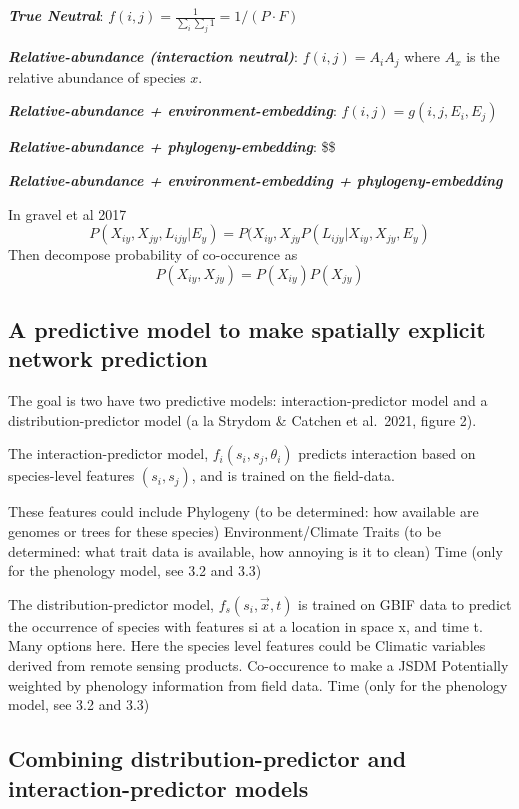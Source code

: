 \documentclass[11pt]{article}
\begin{document}
\textbf{\emph{True Neutral}}:
\(f(i,j) = \frac{1}{\sum_i \sum_j 1} = 1 / (P\cdot F)\)

\textbf{\emph{Relative-abundance (interaction neutral)}}:
\(f(i,j) = A_i A_j\) where \(A_x\) is the relative abundance of species
\(x\).

\textbf{\emph{Relative-abundance + environment-embedding}}:
\(f(i,j) = g(i,j, E_i, E_j)\)

\textbf{\emph{Relative-abundance + phylogeny-embedding}}: \$\$

\textbf{\emph{Relative-abundance + environment-embedding +
phylogeny-embedding}}

In gravel et al 2017
\[P(X_{iy}, X_{jy}, L_{ijy} | E_y) = P(X_{iy},X_{jy}P(L_{ijy} | X_{iy}, X_{jy}, E_y)\]
Then decompose probability of co-occurence as
\[P(X_{iy}, X_{jy}) = P(X_{iy})P(X_{jy})\]

\hypertarget{a-predictive-model-to-make-spatially-explicit-network-prediction}{%
\subsection{A predictive model to make spatially explicit network
prediction}\label{a-predictive-model-to-make-spatially-explicit-network-prediction}}

The goal is two have two predictive models: interaction-predictor model
and a distribution-predictor model (a la Strydom \& Catchen et al.~2021,
figure 2).

The interaction-predictor model, \(f_i(s_i,s_j, \theta_i)\) predicts
interaction based on species-level features \((s_i, s_j)\), and is
trained on the field-data.

These features could include Phylogeny (to be determined: how available
are genomes or trees for these species) Environment/Climate Traits (to
be determined: what trait data is available, how annoying is it to
clean) Time (only for the phenology model, see 3.2 and 3.3)

The distribution-predictor model, \(f_s(s_i, \vec{x}, t)\) is trained on
GBIF data to predict the occurrence of species with features si at a
location in space x, and time t. Many options here. Here the species
level features could be Climatic variables derived from remote sensing
products. Co-occurence to make a JSDM Potentially weighted by phenology
information from field data. Time (only for the phenology model, see 3.2
and 3.3)

\hypertarget{combining-distribution-predictor-and-interaction-predictor-models}{%
\subsection{Combining distribution-predictor and interaction-predictor
models}\label{combining-distribution-predictor-and-interaction-predictor-models}}
\end{document}

